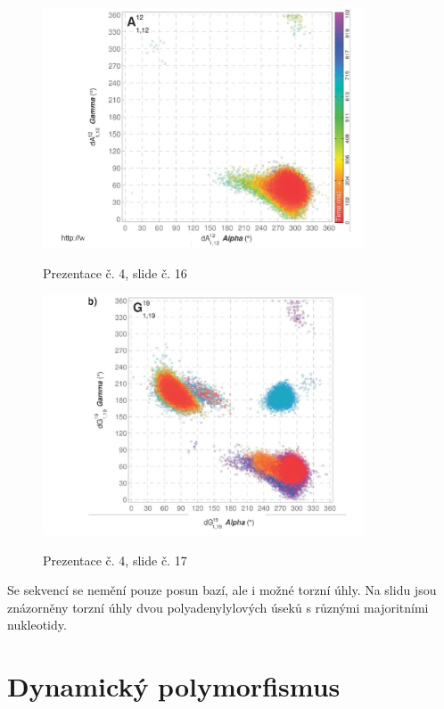 \documentclass[DIV=8]{scrreprt}
\begin{document}
\begin{figure}
    \caption{Prezentace č. 4, slide č. 16}
    \includegraphics[width=0.85\textwidth]{slides-4/slide-16.jpg}
    \centering
    \label{slides-4-slide-16}
\end{figure}
\begin{figure}
    \caption{Prezentace č. 4, slide č. 17}
    \includegraphics[width=0.85\textwidth]{slides-4/slide-17.jpg}
    \centering
    \label{slides-4-slide-17}
\end{figure}
 Se sekvencí se nemění pouze posun bazí, ale i možné torzní úhly. Na slidu jsou znázorněny torzní úhly dvou polyadenylylových úseků s různými majoritními nukleotidy.

\section{Dynamický polymorfismus} \label{Dynamický polymorfismus} \FloatBarrier
\end{document}
